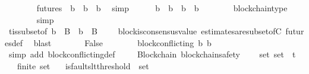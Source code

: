 \begin{isabellebody}
\ \ \ \ \ \ \isamarkupfalse%
\ {\isacartoucheopen}{\isasymforall}{\isasymsigma}{\isasymin}futures\ {\isasymsigma}{\isachardot}\ {\isasymforall}b{\isacharprime}{\isasymin}{\isasymepsilon}\ {\isasymsigma}{\isachardot}\ b{}\ {\isasymdownharpoonright}\ b{\isacharprime}{\isacartoucheclose}\ \isamarkupfalse%
\ simp\isanewline
\ \ \ \ \isamarkupfalse%
\ {\isachardoublequoteopen}b{}\ {\isasymdownharpoonright}\ b{}\ {\isasymor}\ b{}\ {\isasymdownharpoonright}\ b{}{\isachardoublequoteclose}\isanewline
\ \ \ \ \ \ \isamarkupfalse%
\ blockchain{\isacharunderscore}type\ \isanewline
\ \ \ \ \ \ \isamarkupfalse%
\ {\isacharparenleft}simp{\isacharparenright}\isanewline
\ \ \ \ \ \ \isamarkupfalse%
\ {\isasymSigma}t{\isacharunderscore}is{\isacharunderscore}subset{\isacharunderscore}of{\isacharunderscore}{\isasymSigma}\ {\isacartoucheopen}b{}\ {\isasymin}\ B\ {\isasymand}\ b{}\ {\isasymin}\ B\ {\isasymand}\ {\isasymsigma}\ {\isasymin}\ {\isasymSigma}{\isacartoucheclose}\ block{\isacharunderscore}is{\isacharunderscore}consensus{\isacharunderscore}value\ estimates{\isacharunderscore}are{\isacharunderscore}subset{\isacharunderscore}of{\isacharunderscore}C\ futures{\isacharunderscore}def\ \isamarkupfalse%
\ blast\isanewline
\ \ \ \ \isamarkupfalse%
\ \isamarkupfalse%
\ False\isanewline
\ \ \ \ \ \ \isamarkupfalse%
\ {\isacartoucheopen}block{\isacharunderscore}conflicting\ {\isacharparenleft}b{}{\isacharcomma}\ b{}{\isacharparenright}{\isacartoucheclose}\isanewline
\ \ \ \ \ \ \isamarkupfalse%
\ {\isacharparenleft}simp\ add{\isacharcolon}\ block{\isacharunderscore}conflicting{\isacharunderscore}def{\isacharparenright}\isanewline
\ \ \isamarkupfalse%
\isanewline
{}\isamarkupfalse%
%
\endisatagproof
{\isafoldproof}%
%
\isadelimproof
\isanewline
%
\endisadelimproof
\isanewline
{}\isamarkupfalse%
\ {\isacharparenleft}\ Blockchain{\isacharparenright}\ blockchain{\isacharunderscore}safety\ {\isacharcolon}\isanewline
\ \ {\isachardoublequoteopen}{\isasymforall}\ {\isasymsigma}{\isacharunderscore}set{\isachardot}\ {\isasymsigma}{\isacharunderscore}set\ {\isasymsubseteq}\ {\isasymSigma}t\isanewline
\ \ {\isasymlongrightarrow}\ finite\ {\isasymsigma}{\isacharunderscore}set\isanewline
\ \ {\isasymlongrightarrow}\ is{\isacharunderscore}faults{\isacharunderscore}lt{\isacharunderscore}threshold\ {\isacharparenleft}{\isasymUnion}\ {\isasymsigma}{\isacharunderscore}set{\isacharparenright}\isanewline

\end{isabellebody}
